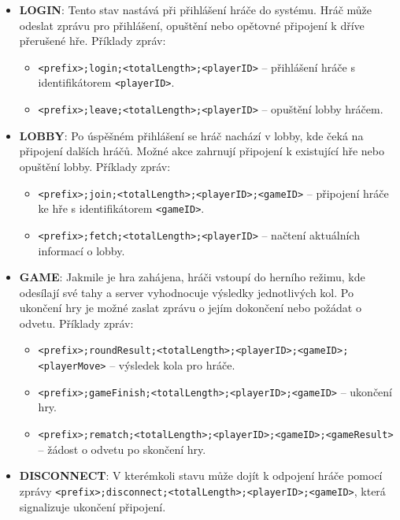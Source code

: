 \documentclass[12pt, a4paper]{article}
\begin{document}
\begin{itemize}
    \item \textbf{LOGIN}: Tento stav nastává při přihlášení hráče do systému. Hráč může odeslat zprávu pro přihlášení, opuštění nebo opětovné připojení k dříve přerušené hře. Příklady zpráv:
    \begin{itemize}
        \item \texttt{<prefix>;login;<totalLength>;<playerID>} – přihlášení hráče s identifikátorem \texttt{<playerID>}.
        \item \texttt{<prefix>;leave;<totalLength>;<playerID>} – opuštění lobby hráčem.
    \end{itemize}

    \item \textbf{LOBBY}: Po úspěšném přihlášení se hráč nachází v lobby, kde čeká na připojení dalších hráčů. Možné akce zahrnují připojení k existující hře nebo opuštění lobby. Příklady zpráv:
    \begin{itemize}
        \item \texttt{<prefix>;join;<totalLength>;<playerID>;<gameID>} – připojení hráče ke hře s identifikátorem \texttt{<gameID>}.
        \item \texttt{<prefix>;fetch;<totalLength>;<playerID>} – načtení aktuálních informací o lobby.
    \end{itemize}

    \item \textbf{GAME}: Jakmile je hra zahájena, hráči vstoupí do herního režimu, kde odesílají své tahy a server vyhodnocuje výsledky jednotlivých kol. Po ukončení hry je možné zaslat zprávu o jejím dokončení nebo požádat o odvetu. Příklady zpráv:
    \begin{itemize}
        \item \texttt{<prefix>;roundResult;<totalLength>;<playerID>;<gameID>;<playerMove>} – výsledek kola pro hráče.
        \item \texttt{<prefix>;gameFinish;<totalLength>;<playerID>;<gameID>} – ukončení hry.
        \item \texttt{<prefix>;rematch;<totalLength>;<playerID>;<gameID>;<gameResult>} – žádost o odvetu po skončení hry.
    \end{itemize}
    
    \item \textbf{DISCONNECT}: V kterémkoli stavu může dojít k odpojení hráče pomocí zprávy \texttt{<prefix>;disconnect;<totalLength>;<playerID>;<gameID>}, která signalizuje ukončení připojení.
\end{itemize}
\end{document}
